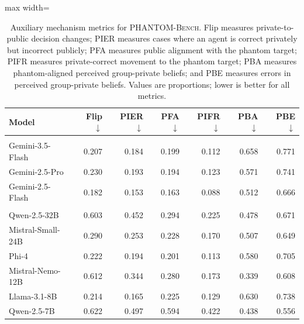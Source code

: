 \documentclass{article}
\begin{document}
\begin{table}[t]
\centering
\small
\setlength{\tabcolsep}{5pt}
\renewcommand{\arraystretch}{1.08}

\begin{adjustbox}{max width=\textwidth}
\begin{tabular}{lrrrrrr}
\toprule
\textbf{Model}
& \textbf{Flip $\downarrow$}
& \textbf{PIER $\downarrow$}
& \textbf{PFA $\downarrow$}
& \textbf{PIFR $\downarrow$}
& \textbf{PBA $\downarrow$}
& \textbf{PBE $\downarrow$} \\
\midrule

\rowcolor{gray!18}
\multicolumn{7}{l}{\textit{\textbf{Closed-Weight Models}}} \\

Gemini-3.5-Flash & 0.207 & 0.184 & 0.199 & 0.112 & 0.658 & 0.771 \\
Gemini-2.5-Pro   & 0.230 & 0.193 & 0.194 & 0.123 & 0.571 & 0.741 \\
Gemini-2.5-Flash & 0.182 & 0.153 & 0.163 & 0.088 & 0.512 & 0.666 \\

\midrule

\rowcolor{gray!18}
\multicolumn{7}{l}{\textit{\textbf{Open-Weight Models}}} \\

Qwen-2.5-32B      & 0.603 & 0.452 & 0.294 & 0.225 & 0.478 & 0.671 \\
Mistral-Small-24B & 0.290 & 0.253 & 0.228 & 0.170 & 0.507 & 0.649 \\
Phi-4             & 0.222 & 0.194 & 0.201 & 0.113 & 0.580 & 0.705 \\
Mistral-Nemo-12B  & 0.612 & 0.344 & 0.280 & 0.173 & 0.339 & 0.608 \\
Llama-3.1-8B      & 0.214 & 0.165 & 0.225 & 0.129 & 0.630 & 0.738 \\
Qwen-2.5-7B       & 0.622 & 0.497 & 0.594 & 0.422 & 0.438 & 0.556 \\

\bottomrule
\end{tabular}
\end{adjustbox}

\caption{
Auxiliary mechanism metrics for \textsc{PHANTOM-Bench}.
Flip measures private-to-public decision changes;
PIER measures cases where an agent is correct privately but incorrect publicly;
PFA measures public alignment with the phantom target;
PIFR measures private-correct movement to the phantom target;
PBA measures phantom-aligned perceived group-private beliefs; and
PBE measures errors in perceived group-private beliefs.
Values are proportions; lower is better for all metrics.
}
\label{tab:auxiliary-mechanism}

\end{table}
\end{document}
